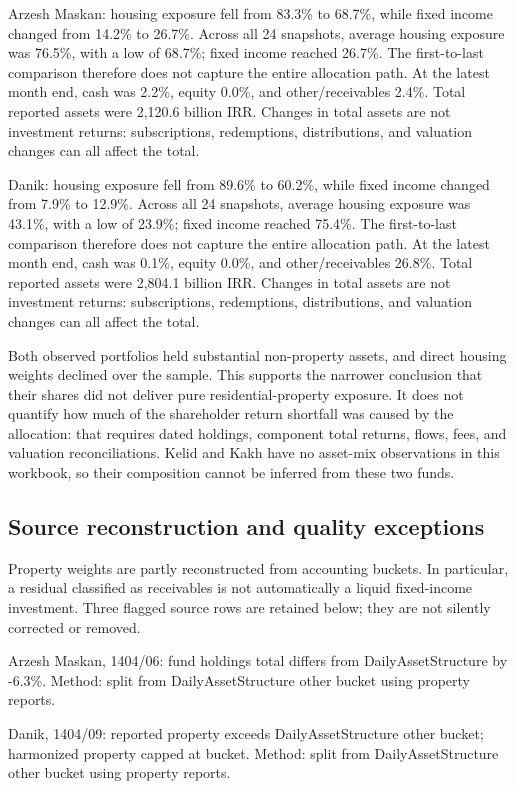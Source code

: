 \documentclass[11pt,a4paper]{article}
\begin{document}
Arzesh Maskan: housing exposure fell from 83.3\% to 68.7\%, while fixed income changed from 14.2\% to 26.7\%. Across all 24 snapshots, average housing exposure was 76.5\%, with a low of 68.7\%; fixed income reached 26.7\%. The first-to-last comparison therefore does not capture the entire allocation path. At the latest month end, cash was 2.2\%, equity 0.0\%, and other/receivables 2.4\%. Total reported assets were 2,120.6 billion IRR. Changes in total assets are not investment returns: subscriptions, redemptions, distributions, and valuation changes can all affect the total.

Danik: housing exposure fell from 89.6\% to 60.2\%, while fixed income changed from 7.9\% to 12.9\%. Across all 24 snapshots, average housing exposure was 43.1\%, with a low of 23.9\%; fixed income reached 75.4\%. The first-to-last comparison therefore does not capture the entire allocation path. At the latest month end, cash was 0.1\%, equity 0.0\%, and other/receivables 26.8\%. Total reported assets were 2,804.1 billion IRR. Changes in total assets are not investment returns: subscriptions, redemptions, distributions, and valuation changes can all affect the total.

Both observed portfolios held substantial non-property assets, and direct housing weights declined over the sample. This supports the narrower conclusion that their shares did not deliver pure residential-property exposure. It does not quantify how much of the shareholder return shortfall was caused by the allocation: that requires dated holdings, component total returns, flows, fees, and valuation reconciliations. Kelid and Kakh have no asset-mix observations in this workbook, so their composition cannot be inferred from these two funds.

\subsection{Source reconstruction and quality exceptions}

Property weights are partly reconstructed from accounting buckets. In particular, a residual classified as receivables is not automatically a liquid fixed-income investment. Three flagged source rows are retained below; they are not silently corrected or removed.

Arzesh Maskan, 1404/06: fund holdings total differs from DailyAssetStructure by -6.3\%. Method: split from DailyAssetStructure other bucket using property reports.

Danik, 1404/09: reported property exceeds DailyAssetStructure other bucket; harmonized property capped at bucket. Method: split from DailyAssetStructure other bucket using property reports.
\end{document}
